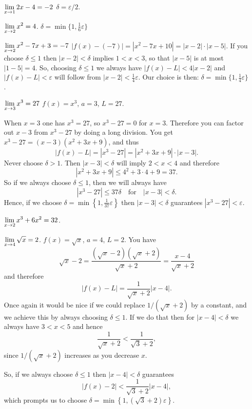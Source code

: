 \begin{multicols}{3}\setlength{\parindent}{0pt}

\problem \(\displaystyle \lim_{x\to 1} 2x-4 = -2 \) 
\answer 
$\delta = \varepsilon/2$.
\endanswer

\problem \(\displaystyle\lim_{x\to2} x^2 = 4\). 
\answer 
$\delta = \min \bigl\{1, \frac16\varepsilon\bigr\}$
\endanswer

\problem \(\displaystyle \lim_{x\to 2} x^2-7x +3 = -7 \) 
\answer 
$|f(x) - (-7) |=|x^2-7x+10| = |x-2|\cdot|x-5| $.  If you choose
$\delta\leq 1$ then $|x-2|<\delta$ implies $1<x<3$, so that $|x-5|$
is at most $|1-5| = 4$.
So, choosing $\delta\leq 1$ we always have $|f(x) - L|<4|x-2|$ and
$|f(x) - L|<\varepsilon$ will follow from $|x-2|<\frac14\varepsilon$.
Our choice is then: $\delta = \min \bigl\{1, \frac14\varepsilon
\bigr\}$.
\endanswer

\problem \(\displaystyle \lim_{x\to 3} x^3 = 27 \) 
\answer $f(x) = x^3$, $a=3$, $L=27$. 

When $x=3$ one has $x^3=27$, so $x^3-27=0$ for $x=3$.  Therefore you
can factor out $x-3$ from $x^3-27$ by doing a long division.  You get
$x^3-27 = (x-3)(x^2+3x+9)$, and thus
\[
|f(x) - L| = |x^3-27| =|x^2+3x+9|\cdot|x-3|.
\]
Never choose $\delta>1$.  Then $|x-3|<\delta$ will imply $2<x<4$ and
therefore
\[
|x^2+3x+9| \leq 4^2+3\cdot4+9 = 37.
\]
So if we always choose $\delta\leq 1$, then we will always have
\[
|x^3-27|\leq 37\delta \quad\text{for}\quad |x-3|<\delta.
\]
Hence, if we choose $\delta=\min\left\{ 1, \tfrac1{37}\varepsilon
\right\}$ then $|x-3|<\delta$ guarantees $|x^3-27| < \varepsilon$.


\endanswer

\problem \(\displaystyle\lim_{x\to2} x^3 + 6x^2 = 32\). 

\problem \label{ex:03limitofsqrt4} 
$\displaystyle \lim_{x\to4}\sqrt x = 2$.
\answer 
$f(x) = \sqrt x$, $a=4$, $L=2$.
You have
\[
\sqrt x - 2 = \frac{(\sqrt x-2)(\sqrt x +2)}{\sqrt x +2}
=\frac{x-4}{\sqrt x+2}
\]
and therefore
\begin{equation}\label{eq:03sol-fx-L-estimate}
  |f(x) - L | = \frac{1}{\sqrt x+2}|x-4|.
\end{equation}
Once again it would be nice if we could replace $1/(\sqrt x + 2)$ by
a constant, and we achieve this by always choosing $\delta\leq 1$.
If we do that then for $|x-4|<\delta$ we always have $3<x<5$ and
hence
\[
\frac{1}{\sqrt x+2} < \frac{1}{\sqrt 3 +2},
\]
since $1/(\sqrt x+ 2)$ increases as you decrease $x$.

So, if we always choose $\delta\leq 1$ then $|x-4|<\delta$ guarantees
\[
|f(x)-2| < \frac1{\sqrt3 +2}|x-4|,
\]
which prompts us to choose $\delta = \min\left\{ 1, (\sqrt
  3+2)\varepsilon \right\}$.


\end{multicols}
